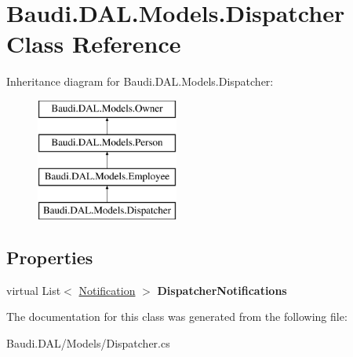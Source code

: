 \hypertarget{class_baudi_1_1_d_a_l_1_1_models_1_1_dispatcher}{}\section{Baudi.\+D\+A\+L.\+Models.\+Dispatcher Class Reference}
\label{class_baudi_1_1_d_a_l_1_1_models_1_1_dispatcher}
Inheritance diagram for Baudi.\+D\+A\+L.\+Models.\+Dispatcher\+:\begin{figure}[H]
\begin{center}
\leavevmode
\includegraphics[height=4.000000cm]{class_baudi_1_1_d_a_l_1_1_models_1_1_dispatcher}
\end{center}
\end{figure}
\subsection*{Properties}
\begin{DoxyCompactItemize}
\item 
\hypertarget{class_baudi_1_1_d_a_l_1_1_models_1_1_dispatcher_a1a3f08c11b9d77c93131e396282b4ff6}{}virtual List$<$ \hyperlink{class_baudi_1_1_d_a_l_1_1_models_1_1_notification}{Notification} $>$ {\bfseries Dispatcher\+Notifications}\label{class_baudi_1_1_d_a_l_1_1_models_1_1_dispatcher_a1a3f08c11b9d77c93131e396282b4ff6}

\end{DoxyCompactItemize}


The documentation for this class was generated from the following file\+:\begin{DoxyCompactItemize}
\item 
Baudi.\+D\+A\+L/\+Models/Dispatcher.\+cs\end{DoxyCompactItemize}
